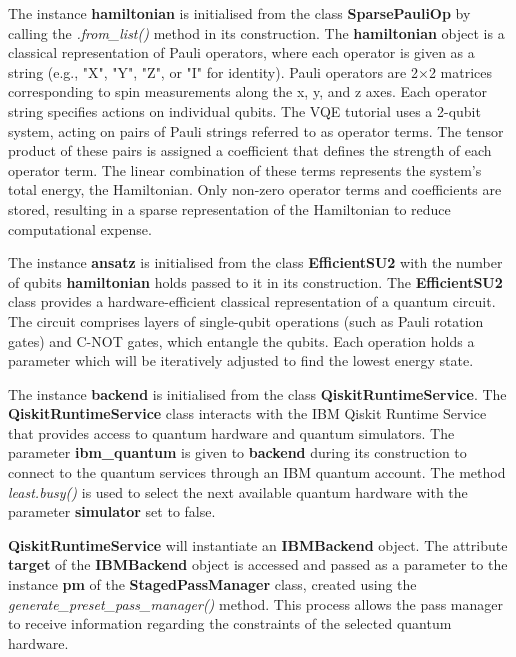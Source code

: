 \documentclass{article}
\begin{document}
{The instance \textbf{hamiltonian} is initialised from the class \textbf{SparsePauliOp} by calling the \textit{.from\_list()} method in its construction. The \textbf{hamiltonian} object is a classical representation of Pauli operators, where each operator is given as a string (e.g., "X", "Y", "Z", or "I" for identity). Pauli operators are 2×2 matrices corresponding to spin measurements along the x, y, and z axes\cite{DJORDJEVIC201229}. Each operator string specifies actions on individual qubits. The VQE tutorial uses a 2-qubit system, acting on pairs of Pauli strings referred to as operator terms. The tensor product of these pairs is assigned a coefficient that defines the strength of each operator term. The linear combination of these terms represents the system's total energy, the Hamiltonian. Only non-zero operator terms and coefficients are stored, resulting in a sparse representation of the Hamiltonian to reduce computational expense\cite{EITCA2024}\cite{SparsePauliOp}\cite{PauliList}.

The instance \textbf{ansatz} is initialised from the class \textbf{EfficientSU2} with the number of qubits \textbf{hamiltonian} holds passed to it in its construction. The \textbf{EfficientSU2} class provides a hardware-efficient classical representation of a quantum circuit\cite{EfficientSU2}. The circuit comprises layers of single-qubit operations (such as Pauli rotation gates) and C-NOT gates, which entangle the qubits\cite{EfficientSU2}. Each operation holds a parameter which will be iteratively adjusted to find the lowest energy state.

The instance \textbf{backend} is initialised from the class \textbf{QiskitRuntimeService}. The \textbf{QiskitRuntimeService} class interacts with the IBM Qiskit Runtime Service that provides access to quantum hardware and quantum simulators. The parameter \textbf{ibm\_quantum} is given to \textbf{backend} during its construction to connect to the quantum services through an IBM quantum account\cite{qrsreadme}. The method \textit{least.busy()} is used to select the next available quantum hardware with the parameter \textbf{simulator} set to false.

\textbf{QiskitRuntimeService} will instantiate an \textbf{IBMBackend} object. The attribute \textbf{target} of the \textbf{IBMBackend} object is accessed and passed as a parameter to the instance \textbf{pm} of the \textbf{StagedPassManager} class, created using the \textit{generate\_preset\_pass\_manager()} method. This process allows the pass manager to receive information regarding the constraints of the selected quantum hardware.

}
\end{document}
